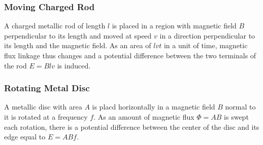 \documentclass[../main]{subfiles}
\begin{document}
	\subsubsection{Moving Charged Rod}

	A charged metallic rod of length \(l\) is placed in a region with magnetic field \(B\) perpendicular to its length and moved at speed \(v\) in a direction perpendicular to its length and the magnetic field. As an area of \(lvt\) in a unit of time, magnetic flux linkage thus changes and a potential difference between the two terminals of the rod \( E = B l v\) is induced.

	\subsubsection{Rotating Metal Disc}

	A metallic disc with area \(A\) is placd horizontally in a magnetic field \(B\) normal to it is rotated at a frequency \(f\). As an amount of magnetic flux \(\Phi = A B\) is swept each rotation, there is a potential difference between the center of the disc and its edge equal to \(E = A B f\). \\
\end{document}
